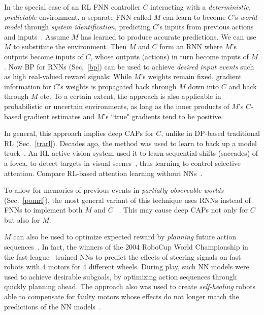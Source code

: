 \documentclass[letterpaper]{article}
\begin{document}
\begin{CJK*}{UTF8}{gbsn}
\begin{sloppypar}
In the special case of an RL FNN controller 
$C$ interacting with a 
{\em deterministic, predictable} environment, 
a separate FNN called $M$ 
can learn to become $C$'s {\em world model} through {\em system identification},
predicting $C$'s inputs from previous actions and inputs~\citep[e.g.,][]{Werbos:81sensitivity,Werbos:87,Munro:87,Jordan:88,Werbos:89identification,Werbos:89neurocontrol,RobinsonFallside:89,JordanRumelhart:90,Schmidhuber:90sandiego,narendra1990,Werbos:92sticky,kawato1993,cochocki1993,levin1995,miller1995,ljung1998,prokhorov2001,ge2010}.
Assume $M$ has learned to produce accurate predictions.
We can use $M$ to substitute the environment.
Then $M$ and $C$ form an RNN where $M$'s outputs become inputs of $C$, 
whose outputs (actions) in turn become inputs of $M$.
Now BP  for RNNs (Sec.~\ref{bp}) can be used 
to achieve {\em desired input events}  such as high real-valued reward signals:
While $M$'s weights remain fixed,
gradient information for $C$'s weights is propagated
back through $M$ down into $C$ and
back through $M$ etc. 
To a certain extent, the approach is also applicable in probabilistic or uncertain environments, as long as the inner products of $M$'s $C$-based gradient estimates and $M$'s ``true" gradients tend to be positive. 

In general, this approach
 implies deep CAPs for $C$, unlike in DP-based traditional  RL (Sec.~\ref{trarl}).
Decades ago, the method was used to
 learn to back up a model truck~\citep{NguyenWidrow:89}.
An RL active vision system used it to learn sequential shifts (saccades) of a fovea, to
detect targets in visual scenes~\citep{SchmidhuberHuber:91},
thus learning to control selective attention.
Compare RL-based attention learning without NNs~\citep{Whitehead:92}.


To allow for memories of previous events in
{\em partially observable worlds}
 (Sec.~\ref{pomrl}),
the most general variant of this technique uses 
RNNs instead of FNNs to implement both $M$ and $C$ ~\citep{Schmidhuber:90sandiego,Schmidhuber:91nips,feldkamp1998}.
This may cause deep CAPs not only for $C$ but also for $M$.

$M$ can also be used to optimize expected reward by {\em planning} future action sequences~\citep{Schmidhuber:90sandiego}.
In fact, the winners of the 2004 RoboCup World Championship in the fast league~\citep{egorova03}
trained NNs to predict the effects of steering signals on fast
robots with 4 motors for 4 different wheels. During play, such NN models were used 
to achieve desirable subgoals, 
by optimizing action sequences through quickly planning ahead. The approach also
was used to create {\em self-healing} robots able to compensate for faulty motors whose effects do not longer 
match the predictions of the NN models~\citep{gloye05,schmidhuber2007pro}. 


\end{sloppypar}
\end{CJK*}
\end{document}
